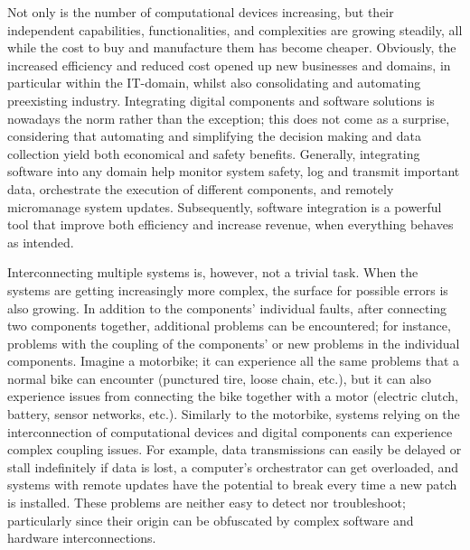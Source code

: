 Not only is the number of computational devices increasing, but their independent capabilities, functionalities, and complexities are growing steadily, all while the cost to buy and manufacture them has become cheaper.
Obviously, the increased efficiency and reduced cost opened up new businesses and domains, in particular within the IT-domain, whilst also consolidating and automating preexisting industry.
Integrating digital components and software solutions is nowadays the norm rather than the exception; this does not come as a surprise, considering that automating and simplifying the decision making and data collection yield both economical and safety benefits.
Generally, integrating software into any domain help monitor system safety, log and transmit important data, orchestrate the execution of different components, and remotely micromanage system updates.
Subsequently, software integration is a powerful tool that improve both efficiency and increase revenue, when everything behaves as intended.


Interconnecting multiple systems is, however, not a trivial task.
When the systems are getting increasingly more complex, the surface for possible errors is also growing.
In addition to the components' individual faults, after connecting two components together, additional problems can be encountered; for instance, problems with the coupling of the components' or new problems in the individual components.
Imagine a motorbike; it can experience all the same problems that a normal bike can encounter (punctured tire, loose chain, etc.), but it can also experience issues from connecting the bike together with a motor (electric clutch, battery, sensor networks, etc.). 
Similarly to the motorbike, systems relying on the interconnection of computational devices and digital components can experience complex coupling issues.
For example, data transmissions can easily be delayed or stall indefinitely if data is lost, a computer's orchestrator can get overloaded, and systems with remote updates have the potential to break every time a new patch is installed.
These problems are neither easy to detect nor troubleshoot; particularly since their origin can be obfuscated by complex software and hardware interconnections.

